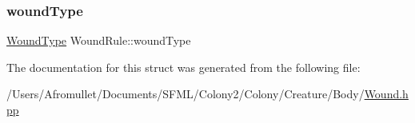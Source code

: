 \mbox{\label{struct_wound_rule_a839c23c859a5163785778a61a093970c}} 
\subsubsection{\texorpdfstring{wound\+Type}{woundType}}
{\footnotesize\ttfamily \mbox{\hyperlink{_enum_types_8hpp_a585daaeecd1f9f1350c24bf0081a734e}{Wound\+Type}} Wound\+Rule\+::wound\+Type}



The documentation for this struct was generated from the following file\+:\begin{DoxyCompactItemize}
\item 
/\+Users/\+Afromullet/\+Documents/\+S\+F\+M\+L/\+Colony2/\+Colony/\+Creature/\+Body/\mbox{\hyperlink{_wound_8hpp}{Wound.\+hpp}}\end{DoxyCompactItemize}
